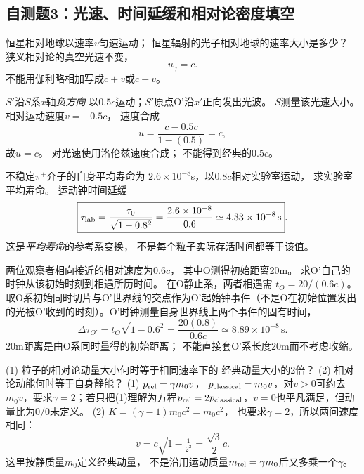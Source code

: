 \subsection{自测题3：光速、时间延缓和相对论密度填空}

\problemtext 恒星相对地球以速率$v$匀速运动；
恒星辐射的光子相对地球的速率大小是多少？
\workings
狭义相对论的真空光速不变，
\[
\boxed{u_\gamma=c}.
\]
\crosscheck 不能用伽利略相加写成$c+v$或$c-v$。

\problemtext $S'$沿$S$系$x$轴\emph{负方向}
以$0.5c$运动；$S'$原点O'沿$x'$正向发出光波。
$S$测量该光速大小。
\workings
相对运动速度$v=-0.5c$，
速度合成
\[
u=\frac{c-0.5c}{1-(0.5)}=c,
\]
故$\boxed{u=c}$。
\crosscheck 对光速使用洛伦兹速度合成；
不能得到经典的$0.5c$。

\problemtext 不稳定$\pi^+$介子的自身平均寿命为
$2.6\times10^{-8}$s，以$0.8c$相对实验室运动，
求实验室平均寿命。
\workings
运动钟时间延缓
\[
\boxed{\tau_{\rm lab}
=\frac{\tau_0}{\sqrt{1-0.8^2}}
=\frac{2.6\times10^{-8}}{0.6}
\simeq4.33\times10^{-8}\,\mathrm s}.
\]
\crosscheck 这是\emph{平均寿命}的参考系变换，
不是每个粒子实际存活时间都等于该值。

\problemtext 两位观察者相向接近的相对速度为$0.6c$，
其中O测得初始距离20m。
求O'自己的时钟从该初始时刻到相遇所历时间。
\workings
在O静止系，两者相遇需
$t_O=20/(0.6c)$。
取O系初始同时切片与O'世界线的交点作为O'起始钟事件（不是O在初始位置发出的光被O'收到的时刻）。O'时钟测量自身世界线上两个事件的固有时间，
\[
\boxed{\Delta\tau_{O'}=
t_O\sqrt{1-0.6^2}
=\frac{20(0.8)}{0.6c}
\simeq8.89\times10^{-8}\,\mathrm s}.
\]
\crosscheck 20m距离是由O系同时量得的初始距离；
不能直接套O'系长度20m而不考虑收缩。

\problemtext (1) 粒子的相对论动量大小何时等于相同速率下的
经典动量大小的2倍？
(2) 相对论动能何时等于自身静能？
\workings
(1) $p_{\rm rel}=\gamma m_0v$，
$p_{\rm classical}=m_0v$，对$v>0$可约去$m_0v$，要求$\gamma=2$；若只把(1)理解为方程$p_{\rm rel}=2p_{\rm classical}$，$v=0$也平凡满足，但动量比为$0/0$未定义。
(2) $K=(\gamma-1)m_0c^2=m_0c^2$，
也要求$\gamma=2$，所以两问速度相同：
\[
\boxed{v=c\sqrt{1-\tfrac1{2^2}}
=\frac{\sqrt3}{2}c}.
\]
\crosscheck 这里按静质量$m_0$定义经典动量，
不是沿用运动质量$m_{\rm rel}=\gamma m_0$后又多乘一个$\gamma$。

